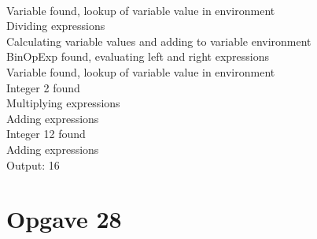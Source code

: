 \documentclass[a4paper, 10pt]{article}
\theoremstyle{remark}
\begin{document}
\\Variable found, lookup of variable value in environment
\\Dividing expressions
\\Calculating variable values and adding to variable environment
\\BinOpExp found, evaluating left and right expressions
\\Variable found, lookup of variable value in environment
\\Integer 2 found
\\Multiplying expressions
\\Adding expressions
\\Integer 12 found
\\Adding expressions
\\Output: 16
\section*{Opgave 28}
\end{document}
